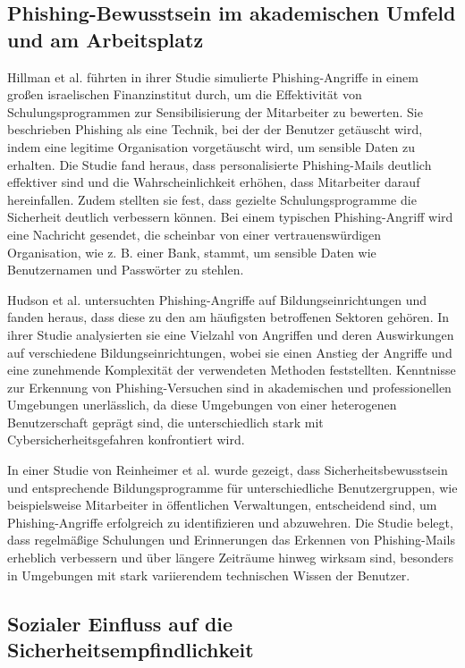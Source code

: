 \documentclass[german,report]{i1thesis}
\begin{document}
\subsection{Phishing-Bewusstsein im akademischen Umfeld und am Arbeitsplatz}

Hillman et al. \cite{hillman2023evaluating} führten in ihrer Studie simulierte Phishing-Angriffe in einem großen israelischen Finanzinstitut durch, um die Effektivität von Schulungsprogrammen zur Sensibilisierung der Mitarbeiter zu bewerten. Sie beschrieben Phishing als eine Technik, bei der der Benutzer getäuscht wird, indem eine legitime Organisation vorgetäuscht wird, um sensible Daten zu erhalten. Die Studie fand heraus, dass personalisierte Phishing-Mails deutlich effektiver sind und die Wahrscheinlichkeit erhöhen, dass Mitarbeiter darauf hereinfallen. Zudem stellten sie fest, dass gezielte Schulungsprogramme die Sicherheit deutlich verbessern können. Bei einem typischen Phishing-Angriff wird eine Nachricht gesendet, die scheinbar von einer vertrauenswürdigen Organisation, wie z. B. einer Bank, stammt, um sensible Daten wie Benutzernamen und Passwörter zu stehlen.

Hudson et al. \cite{hudson2023phishing} untersuchten Phishing-Angriffe auf Bildungseinrichtungen und fanden heraus, dass diese zu den am häufigsten betroffenen Sektoren gehören. In ihrer Studie analysierten sie eine Vielzahl von Angriffen und deren Auswirkungen auf verschiedene Bildungseinrichtungen, wobei sie einen Anstieg der Angriffe und eine zunehmende Komplexität der verwendeten Methoden feststellten. Kenntnisse zur Erkennung von Phishing-Versuchen sind in akademischen und professionellen Umgebungen unerlässlich, da diese Umgebungen von einer heterogenen Benutzerschaft geprägt sind, die unterschiedlich stark mit Cybersicherheitsgefahren konfrontiert wird.

In einer Studie von Reinheimer et al. \cite{reinheimer2020investigation} wurde gezeigt, dass Sicherheitsbewusstsein und entsprechende Bildungsprogramme für unterschiedliche Benutzergruppen, wie beispielsweise Mitarbeiter in öffentlichen Verwaltungen, entscheidend sind, um Phishing-Angriffe erfolgreich zu identifizieren und abzuwehren. Die Studie belegt, dass regelmäßige Schulungen und Erinnerungen das Erkennen von Phishing-Mails erheblich verbessern und über längere Zeiträume hinweg wirksam sind, besonders in Umgebungen mit stark variierendem technischen Wissen der Benutzer.

\subsection{Sozialer Einfluss auf die Sicherheitsempfindlichkeit}
\end{document}
